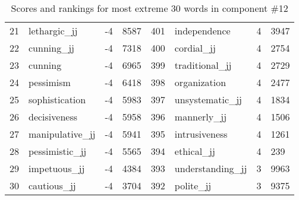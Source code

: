 \begin{table}[tbp]
\begin{tabular}{| rlr@{.}l | rlr@{.}l |}
    21 & lethargic\_jj & -4 & 8587    &    401 & independence & 4 & 3947 \\
    22 & cunning\_jj & -4 & 7318    &    400 & cordial\_jj & 4 & 2754 \\
    23 & cunning & -4 & 6965    &    399 & traditional\_jj & 4 & 2729 \\
    24 & pessimism & -4 & 6418    &    398 & organization & 4 & 2477 \\
    25 & sophistication & -4 & 5983    &    397 & unsystematic\_jj & 4 & 1834 \\
    26 & decisiveness & -4 & 5958    &    396 & mannerly\_jj & 4 & 1506 \\
    27 & manipulative\_jj & -4 & 5941    &    395 & intrusiveness & 4 & 1261 \\
    28 & pessimistic\_jj & -4 & 5565    &    394 & ethical\_jj & 4 & 239 \\
    29 & impetuous\_jj & -4 & 4384    &    393 & understanding\_jj & 3 & 9963 \\
    30 & cautious\_jj & -4 & 3704    &    392 & polite\_jj & 3 & 9375 \\
    \hline
    \end{tabular}
    \caption{Scores and rankings for most extreme 30 words in component \#12} 
\end{table}
\clearpage
